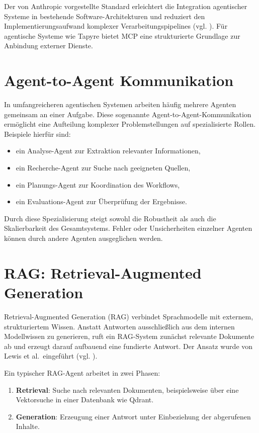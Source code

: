 Der von Anthropic vorgestellte Standard erleichtert die Integration agentischer Systeme in bestehende Software-Architekturen und reduziert den Implementierungsaufwand komplexer Verarbeitungspipelines (vgl. \cite{anthropic2024mcp}). Für agentische Systeme wie Tapyre bietet MCP eine strukturierte Grundlage zur Anbindung externer Dienste.

\section{Agent-to-Agent Kommunikation}

In umfangreicheren agentischen Systemen arbeiten häufig mehrere Agenten gemeinsam an einer Aufgabe. Diese sogenannte Agent-to-Agent-Kommunikation ermöglicht eine Aufteilung komplexer Problemstellungen auf spezialisierte Rollen. Beispiele hierfür sind:

\begin{itemize}
    \item ein Analyse-Agent zur Extraktion relevanter Informationen,
    \item ein Recherche-Agent zur Suche nach geeigneten Quellen,
    \item ein Planungs-Agent zur Koordination des Workflows,
    \item ein Evaluations-Agent zur Überprüfung der Ergebnisse.
\end{itemize}

Durch diese Spezialisierung steigt sowohl die Robustheit als auch die Skalierbarkeit des Gesamtsystems. Fehler oder Unsicherheiten einzelner Agenten können durch andere Agenten ausgeglichen werden.

\section{RAG: Retrieval-Augmented Generation}

Retrieval-Augmented Generation (RAG) verbindet Sprachmodelle mit externem, strukturiertem Wissen. Anstatt Antworten ausschließlich aus dem internen Modellwissen zu generieren, ruft ein RAG-System zunächst relevante Dokumente ab und erzeugt darauf aufbauend eine fundierte Antwort. Der Ansatz wurde von Lewis et al.\ eingeführt (vgl. \cite{lewis2020rag}).

Ein typischer RAG-Agent arbeitet in zwei Phasen:

\begin{enumerate}
    \item \textbf{Retrieval}: Suche nach relevanten Dokumenten, beispielsweise über eine Vektorsuche in einer Datenbank wie Qdrant.
    \item \textbf{Generation}: Erzeugung einer Antwort unter Einbeziehung der abgerufenen Inhalte.
\end{enumerate}

